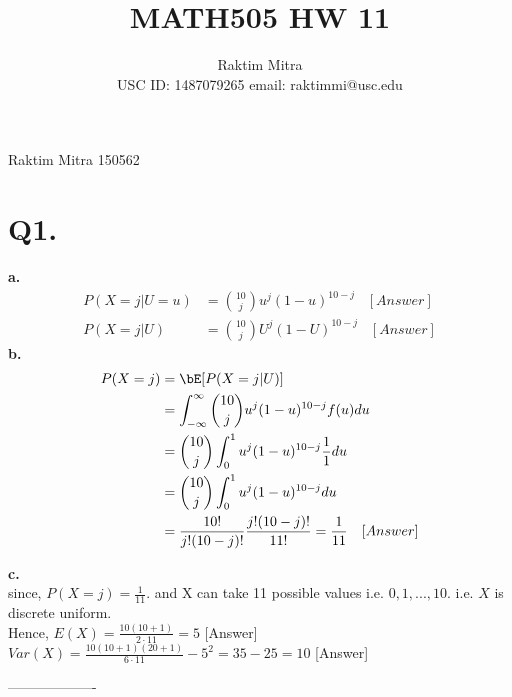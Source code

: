 \documentclass[a4paper,11pt]{article}
\begin{document}
\title{MATH505 HW 11  }
\author{Raktim Mitra \\ \small{USC ID: 1487079265\hspace{10pt} email: raktimmi@usc.edu}}
\maketitle
{}                              					%
								{Raktim Mitra}      						           		%
								{150562}																		%
								
\section*{Q1. }
\textbf{a.}\\
\begin{align*}
 P(X= j | U= u) &= \binom{10}{j}u^j(1-u)^{10-j}\hspace{10pt} [Answer]\\
 P(X = j | U) &= \binom{10}{j}U^j(1-U)^{10-j}\hspace{10pt} [Answer]
\end{align*}
\textbf{b.}\\
\begin{align*}
 P(X = j) &= \bE[P(X = j | U)]\\
 &= \int_{-\infty}^{\infty}\binom{10}{j}u^j(1-u)^{10-j}f(u)du\\
  &= \binom{10}{j}\int_{0}^{1}u^j(1-u)^{10-j}\frac{1}{1}du\\
    &= \binom{10}{j}\int_{0}^{1}u^j(1-u)^{10-j}du\\
    &= \frac{10!}{j!(10-j)!}\frac{j!(10-j)!}{11!} = \frac{1}{11} \hspace{10pt} [Answer]
\end{align*}

\textbf{c.}\\
since, $P(X = j) = \frac{1}{11}$. and X can take 11 possible values i.e. $0,1,...,10$. i.e. $X$ is discrete uniform.\\
Hence, $E(X) = \frac{10(10+1)}{2\cdot11} = 5$ [Answer]\\
$Var(X) =  \frac{10(10+1)(20+1)}{6\cdot 11} - 5^2 =  35 - 25 = 10$ [Answer]
\begin{center}
 -------------------
\end{center}
\end{document}
